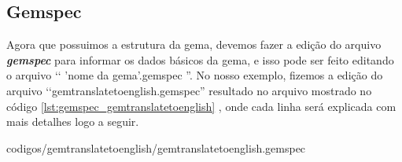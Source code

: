 \subsection{Gemspec}
\label{subsection:gemspec}

Agora que possuimos a estrutura da gema, devemos fazer a edição do arquivo \emph{\textbf{gemspec}}
para informar os dados básicos da gema, e isso pode ser feito editando o arquivo ‘‘ 'nome da gema'.gemspec ''.
No nosso exemplo, fizemos a edição do arquivo ‘‘gemtranslatetoenglish.gemspec'' resultado no arquivo mostrado
no código \ref{lst:gemspec_gemtranslatetoenglish}
, onde cada linha será explicada com mais detalhes logo a seguir.


{codigos/gemtranslatetoenglish/gemtranslatetoenglish.gemspec}

